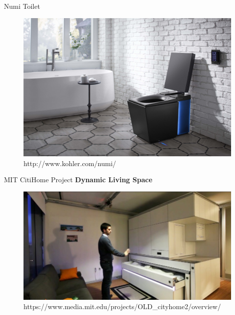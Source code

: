 \documentclass[10pt]{beamer}
\begin{document}
\begin{frame}{Numi Toilet}
	\begin{figure}[H]
	\includegraphics[width=\textwidth]{images/6.jpg}
	\caption{http://www.kohler.com/numi/}
	\end{figure}
\end{frame}

\begin{frame}{MIT CitiHome Project}
	\textbf{Dynamic Living Space}\\
	\vspace{3mm}
	\begin{figure}[H]
	\includegraphics[width=\textwidth]{images/4.jpg}
	\small\caption{https://www.media.mit.edu/projects/OLD\_cityhome2/overview/}
	\end{figure}
\end{frame}
\end{document}
